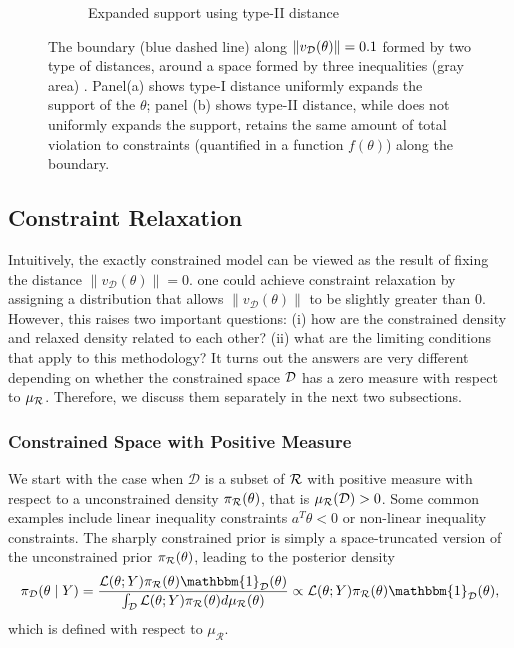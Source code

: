 \documentclass[10pt,fleqn]{article}
\DeclareMathOperator{\1}{\mathbbm{1}} \DeclareMathOperator{\bigO}{\mc O}
\begin{document}
\begin{figure}[H]
\begin{subfigure}[b]{0.45\textwidth}
{\begin{tikzpicture}[scale=3, line join=bevel]
\end{tikzpicture}}
        \caption{Expanded support using type-II distance}
    \end{subfigure}

 \caption{ The boundary (blue dashed line) along $\|v_{\mc D}(\theta)\| = 0.1$  formed by two type of distances, around a space formed by three inequalities (gray area) \label{fig:two_distances}. Panel(a) shows type-I distance uniformly expands
the support of the $\theta$; panel (b) shows type-II distance, while does
not uniformly expands the support, retains the same amount of total violation
 to constraints (quantified in a function $f(\theta)$) along the boundary.}
\end{figure}




\subsection{Constraint Relaxation}
Intuitively, the exactly constrained model can be viewed as the result of fixing the distance $\|v_\mathcal{D}(\theta)\| = 0$.  one could achieve constraint relaxation by assigning
a distribution that allows $\|v_\mathcal{D}(\theta)\|$ to be slightly greater than $0$. However, this raises two important questions:
(i) how are the  constrained density and
relaxed density related to each other? (ii) what are
the limiting conditions that apply to this methodology?
It turns out the answers are very different depending
on whether the constrained space $\mc D$ has a zero
measure with respect to $\mu_{\mc R}$. Therefore, we
discuss them separately in the next two subsections.

\subsubsection{Constrained Space with Positive Measure}


We start with
the case when $\mathcal{D}$ is a subset of $\mc R$ with positive measure with respect to a unconstrained
density $\pi_{\mc R}(\theta)$, that is $\mu_\mathcal{R}(\mc D)>0$.
  Some common examples include linear inequality constraints $a^T\theta < 0$ or non-linear inequality constraints.  The sharply constrained prior is simply a space-truncated version of the unconstrained prior 
$\pi_{\mc R}(\theta)$, leading to the posterior density
$$\pi_\mathcal{D}(\theta\mid Y) = \frac{\mathcal{L}(\theta; Y)
\pi_\mathcal{R}(\theta)\mathbbm{1}_\mathcal{D}(\theta)}{\int_\mathcal{D}
\mathcal{L}(\theta; Y)
\pi_\mathcal{R}(\theta)d\mu_\mathcal{R}(\theta)}\propto \mathcal{L}(\theta;
Y) \pi_\mathcal{R}(\theta)\mathbbm{1}_\mathcal{D}(\theta), $$
which is defined with respect to $\mu_\mathcal{R}$. 
\end{document}
